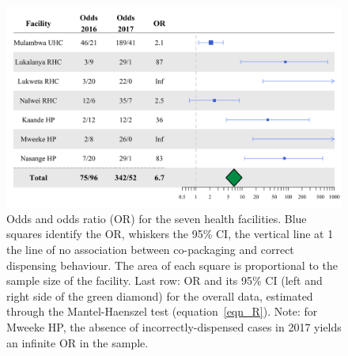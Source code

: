 \documentclass[a4paper, 12pt]{article}
\begin{document}
\begin{figure}
\includegraphics[width=\textwidth]{ForestPlot.png}
\caption{Odds and odds ratio (OR) for the seven health facilities. Blue squares identify the OR, whiskers the 95\% CI, the vertical line at 1 the line of no association between co-packaging and correct dispensing behaviour. The area of each square is proportional to the sample size of the facility. Last row: OR and its 95\% CI (left and right side of the green diamond) for the overall data, estimated through the Mantel-Haenszel test (equation~\eqref{eqn_R}). 
Note: for Mweeke HP, the absence of incorrectly-dispensed cases in 2017 yields an infinite OR in the sample.}
\label{Fig_FP}
\end{figure}




\newpage
 
  
\end{document}
